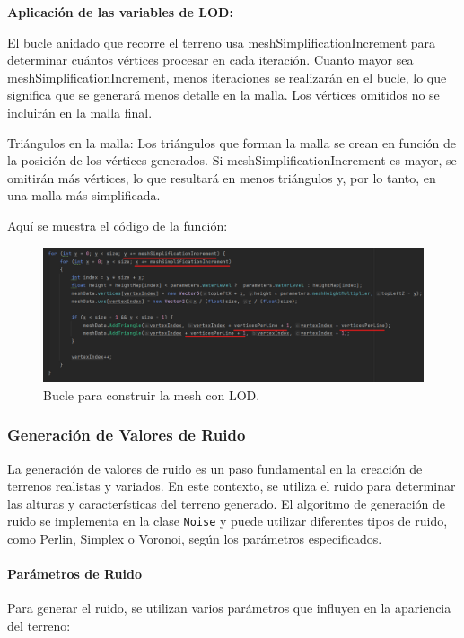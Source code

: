 \textbf{Aplicación de las variables de LOD:}

El bucle anidado que recorre el terreno usa meshSimplificationIncrement para determinar cuántos vértices procesar en cada iteración. Cuanto mayor sea meshSimplificationIncrement, menos iteraciones se realizarán en el bucle, lo que significa que se generará menos detalle en la malla. Los vértices omitidos no se incluirán en la malla final.

Triángulos en la malla: Los triángulos que forman la malla se crean en función de la posición de los vértices generados. Si meshSimplificationIncrement es mayor, se omitirán más vértices, lo que resultará en menos triángulos y, por lo tanto, en una malla más simplificada.

Aquí se muestra el código de la función:
\begin{figure}[h]
    \centering
    \includegraphics[width=1\textwidth]{img/codes/LOD-bucle.png}
    \caption{Bucle para construir la mesh con LOD.}
\end{figure}

\subsubsection{Generación de Valores de Ruido}

La generación de valores de ruido es un paso fundamental en la creación de terrenos realistas y variados. En este contexto, se utiliza el ruido para determinar las alturas y características del terreno generado. El algoritmo de generación de ruido se implementa en la clase \texttt{Noise} y puede utilizar diferentes tipos de ruido, como Perlin, Simplex o Voronoi, según los parámetros especificados.

\paragraph{Parámetros de Ruido}

Para generar el ruido, se utilizan varios parámetros que influyen en la apariencia del terreno:

